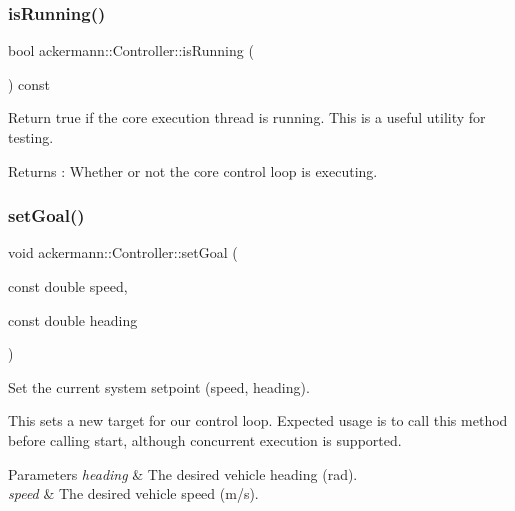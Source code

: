 \subsubsection{\texorpdfstring{is\+Running()}{isRunning()}}
{\footnotesize\ttfamily bool ackermann\+::\+Controller\+::is\+Running (\begin{DoxyParamCaption}{ }\end{DoxyParamCaption}) const}



Return true if the core execution thread is running. This is a useful utility for testing. 

\begin{DoxyReturn}{Returns}
\+: Whether or not the core control loop is executing. 
\end{DoxyReturn}
\mbox{\label{classackermann_1_1_controller_a2c048f93364371bb99445b68cb4ad064}} 
\subsubsection{\texorpdfstring{set\+Goal()}{setGoal()}}
{\footnotesize\ttfamily void ackermann\+::\+Controller\+::set\+Goal (\begin{DoxyParamCaption}\item[{const double}]{speed,  }\item[{const double}]{heading }\end{DoxyParamCaption})}



Set the current system setpoint (speed, heading). 

This sets a new target for our control loop. Expected usage is to call this method before calling \textquotesingle{}start\textquotesingle{}, although concurrent execution is supported.


\begin{DoxyParams}{Parameters}
{\em heading} & The desired vehicle heading (rad). \\
\hline
{\em speed} & The desired vehicle speed (m/s). \\
\hline
\end{DoxyParams}
\mbox{\label{classackermann_1_1_controller_aee37f9adf9e8b2ec31499c8f7838531d}} 
